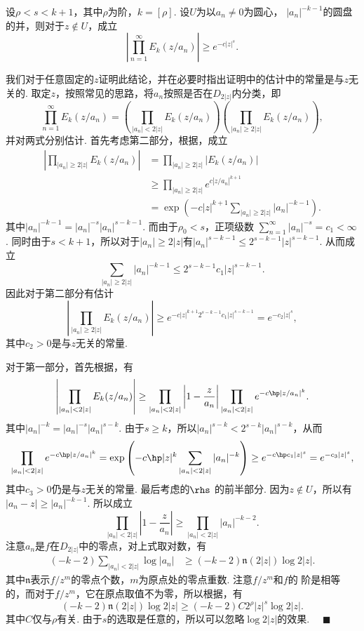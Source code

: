   \begin{lemma}
    \label{lemma: Hadamard}
    设$\rho<s<k+1$，其中$\rho$为阶，$k=[\rho]$. 设$U$为以$a_n\ne 0$为圆心，
    $|a_n|^{-k-1}$的圆盘的并，则对于$z\notin U$，成立
    \[
      \left| \prod_{n=1}^\infty E_k(z/a_n) \right|\ge e^{-c|z|^s}.
    \]
  \end{lemma}
  \proof
    我们对于任意固定的$z$证明此结论，并在必要时指出证明中的估计中的常量是与$z$无关的.
    取定$z$，按照常见的思路，将$a_n$按照是否在$D_{2|z|}$内分类，即
    \[
      \prod_{n=1}^\infty E_k(z/a_n) = \left(\prod_{|a_n|<2|z|} E_k(z/a_n)\right)
      \left(\prod_{|a_n|\ge2|z|} E_k(z/a_n)\right),
    \]
    并对两式分别估计. 首先考虑第二部分，根据，成立
    \[\begin{split}
      \left|\prod_{|a_n|\ge2|z|} E_k(z/a_n)\right| 
      &= \prod_{|a_n|\ge2|z|} |E_k(z/a_n)| \\
      &\ge \prod_{|a_n|\ge 2|z|} e^{c|z/a_n|^{k+1}} \\
      &= \exp\left(-c|z|^{k+1}\sum_{|a_n|\ge2|z|}|a_n|^{-k-1} \right).
    \end{split}\]
    其中$|a_n|^{-k-1} = |a_n|^{-s}|a_n|^{s-k-1}$. 而由于$\rho_0<s$，正项级数
    $\sum_{n=1}^\infty|a_n|^{-s}=c_1<\infty$. 同时由于$s<k+1$，所以对于$|a_n|
    \ge 2|z|$有$|a_n|^{s-k-1}\le 2^{s-k-1}|z|^{s-k-1}$. 从而成立
    \[
      \sum_{|a_n|\ge2|z|}|a_n|^{-k-1} \le 2^{s-k-1}c_1|z|^{s-k-1}.
    \]
    因此对于第二部分有估计
    \[
      \left|\prod_{|a_n|\ge2|z|} E_k(z/a_n)\right| \ge
      e^{-c|z|^{k+1} 2^{s-k-1}c_1|z|^{s-k-1}} = e^{-c_2|z|^s},
    \]
    其中$c_2>0$是与$z$无关的常量.\par
    对于第一部分，首先根据，有
    \begin{equation}
      \label{equ: pord E_k估计}
      \left|\prod_{|a_n|<2|z|} E_k(z/a_n)\right| 
      \ge \prod_{|a_n|<2|z|}\left|1-\frac{z}{a_n}\right|
      \prod_{|a_n|<2|z|}e^{-c\hp|z/a_n|^k}.
    \end{equation}
    其中$|a_n|^{-k}=|a_n|^{-s}|a_n|^{s-k}$. 由于$s\ge k$，所以$|a_n|^{s-k}
    <2^{s-k}|a_n|^{s-k}$，从而
    \[
      \prod_{|a_n|<2|z|}e^{-c\hp|z/a_n|^k} = 
      \exp\left( -c\hp|z|^k\sum_{|a_n|<2|z|}|a_n|^{-k} \right)
      \ge e^{-c\hp c_1|z|^s} = e^{-c_3|z|^s},
    \]
    其中$c_3>0$仍是与$z$无关的常量. 最后考虑的$\rhs$
    的前半部分. 因为$z\notin U$，所以有$|a_n-z|\ge |a_n|^{-k-1}$. 所以成立
    \[
      \prod_{|a_n|<2|z|}\left|1-\frac{z}{a_n}\right| \ge 
      \prod_{|a_n|<2|z|}|a_n|^{-k-2}.
    \]
    注意$a_n$是$f$在$D_{2|z|}$中的零点，对上式取对数，有
    \[\begin{split}
      (-k-2)\sum_{|a_n|<2|z|}\log|a_n| 
      &\ge (-k-2)\mathfrak{n}(2|z|)\log 2|z|.
    \end{split}\]
    其中$\mathfrak{n}$表示$f/z^m$的零点个数，$m$为原点处的零点重数. 注意$f/z^m$和$f$的
    阶是相等的，而对于$f/z^m$，它在原点取值不为零，所以根据，有
    \[
      (-k-2)\mathfrak{n}(2|z|)\log 2|z| 
      \ge (-k-2)C2^\rho|z|^s\log 2|z|.
    \]
    其中$C$仅与$\rho$有关. 由于$s$的选取是任意的，所以可以忽略$\log 2|z|$的效果.
    $\quad\blacksquare$

